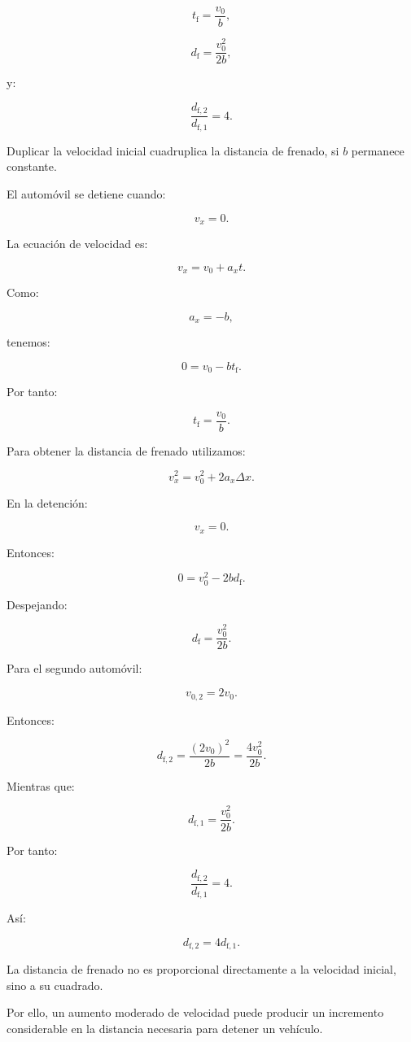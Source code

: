 \begin{respuesta}
\[
\boxed{t_{\mathrm{f}}=\frac{v_0}{b}},
\]

\[
\boxed{d_{\mathrm{f}}=\frac{v_0^2}{2b}},
\]

y:

\[
\boxed{\frac{d_{\mathrm{f},2}}{d_{\mathrm{f},1}}=4}.
\]

Duplicar la velocidad inicial cuadruplica la distancia de frenado, si \(b\) permanece constante.
\end{respuesta}

\begin{explicacion}
El automóvil se detiene cuando:

\[ v_x=0. \]

La ecuación de velocidad es:

\[ v_x=v_0+a_xt. \]

Como:

\[ a_x=-b, \]

tenemos:

\[ 0=v_0-bt_{\mathrm{f}}. \]

Por tanto:

\[ \boxed{t_{\mathrm{f}}=\frac{v_0}{b}}. \]

Para obtener la distancia de frenado utilizamos:

\[ v_x^2=v_0^2+2a_x\Delta x. \]

En la detención:

\[ v_x=0. \]

Entonces:

\[
0=v_0^2-2bd_{\mathrm{f}}.
\]

Despejando:

\[ \boxed{d_{\mathrm{f}}=\frac{v_0^2}{2b}}. \]

Para el segundo automóvil:

\[ v_{0,2}=2v_0. \]

Entonces:

\[
d_{\mathrm{f},2}
=
\frac{(2v_0)^2}{2b}
=
\frac{4v_0^2}{2b}.
\]

Mientras que:

\[
d_{\mathrm{f},1}
=
\frac{v_0^2}{2b}.
\]

Por tanto:

\[
\frac{d_{\mathrm{f},2}}{d_{\mathrm{f},1}}
=
4.
\]

Así:

\[ \boxed{d_{\mathrm{f},2}=4d_{\mathrm{f},1}}. \]

La distancia de frenado no es proporcional directamente a la velocidad inicial, sino a su cuadrado.

Por ello, un aumento moderado de velocidad puede producir un incremento considerable en la distancia necesaria para detener un vehículo.
\end{explicacion}


